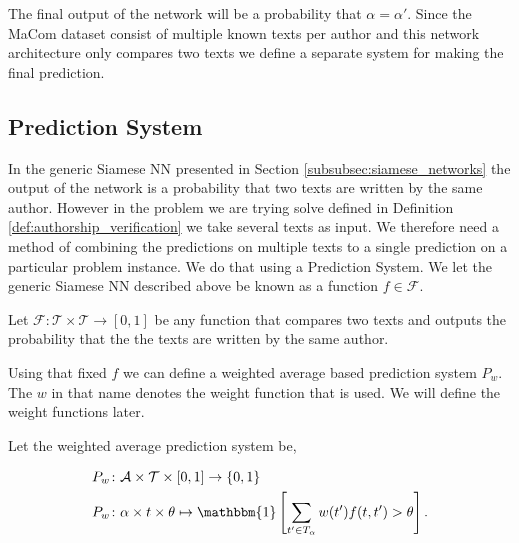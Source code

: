 The final output of the network will be a probability that $\alpha = \alpha'$.
Since the MaCom dataset consist of multiple known texts per author and this
network architecture only compares two texts we define a separate system for
making the final prediction.


\subsection{Prediction System}\label{subsec:prediction_system}

In the generic Siamese \gls{NN} presented in Section
\ref{subsubsec:siamese_networks} the output of the network is a probability that
two texts are written by the same author. However in the problem we are trying
solve defined in Definition \ref{def:authorship_verification} we take several
texts as input. We therefore need a method of combining the predictions on
multiple texts to a single prediction on a particular problem instance. We do
that using a Prediction System. We let the generic Siamese \gls{NN} described
above be known as a function $f \in \mathcal{F}$.

\begin{definition}
    \label{def:text_comparison_function}

    Let $\mathcal{F} \colon \mathcal{T} \times \mathcal{T} \rightarrow [0, 1]$
    be any function that compares two texts and outputs the probability that the
    the texts are written by the same author.

\end{definition}

Using that fixed $f$ we can define a weighted average based prediction system
$P_w$. The $w$ in that name denotes the weight function that is used. We will
define the weight functions later.

\begin{definition}
    \label{def:weighted_average_prediction_system}

    Let the weighted average prediction system be,

    \begin{align}
        &P_w \colon \mathcal{A} \times \mathcal{T} \times [0, 1] \rightarrow
            \{0, 1\} \\
        &P_w \colon \alpha \times t \times \theta \mapsto \mathbbm{1}\left[
                \sum_{t' \in T_\alpha} w(t') f(t, t') > \theta
            \right].
    \end{align}

\end{definition}


